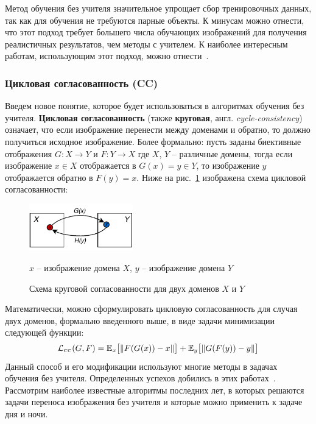 \documentclass[11pt,a4paper]{extarticle}
\begin{document}
		\noindent
		Метод обучения без учителя значительное упрощает сбор тренировочных данных, так как для обучения не требуются парные объекты.
		К минусам можно отнести, что этот подход требует большего числа обучающих изображений для получения реалистичных результатов, чем методы с учителем.
		К наиболее интересным работам, использующим этот подход, можно отнести~\cite{UNIT,MUNIT,CycleGAN}.
		
		\subsubsection{Цикловая согласованность (CC)}\label{sec:cc}

			Введем новое понятие, которое будет использоваться в алгоритмах обучения без учителя.
			\textbf{Цикловая согласованность} (также \textbf{круговая}, англ. \textit{cycle-consistency}) означает,
			что если изображение перенести между доменами и обратно, то должно получиться исходное изображение.
			Более формально: пусть заданы биективные отображения \(G: X \rightarrow Y\) и \(F: Y \rightarrow X \) где \(X\), \(Y\) -- различные домены,
			тогда если изображение \(x \in X\) отображается в \(G(x) = y \in Y\), то изображение \(y\) отображается обратно в \(F(y) = x\).
			Ниже на рис.~\ref{pic:cyc} изображена схема цикловой согласованности:

			\begin{figure}[ht]
				\centering
				\includegraphics[width=0.4\textwidth]{img/cyc}
				\caption{Схема круговой согласованности для двух доменов \(X\) и \(Y\)}{
					\(x\) -- изображение домена \(X\), \(y\) -- изображение домена \(Y\)
				}
				\label{pic:cyc}
			\end{figure}
			\noindent
			Математически, можно сформулировать цикловую согласованность для случая двух доменов, формально введенного выше, в виде задачи минимизации следующей функции:
			\begin{equation}\label{eq:cc}
				\mathcal{L}_{\text{\tiny CC}}(G,F) = \mathbb{E}_{x}\big[\| F(G(x))-x \|\big] + \mathbb{E}_{y}\big[\| G(F(y))-y \|\big]
			\end{equation}
			Данный способ и его модификации используют многие методы в задачах обучения без учителя.
			Определенных успехов добились в этих работах~\cite{UNIT,MUNIT,CycleGAN}.
			Рассмотрим наиболее известные алгоритмы последних лет, в которых решаются задачи переноса изображения без учителя и которые можно применить к задаче дня и ночи.
\end{document}
